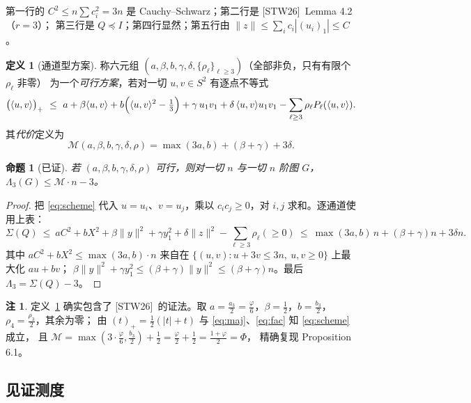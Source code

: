 \documentclass[UTF8,11pt]{ctexart}
\newtheorem{proposition}[theorem]{命题}
\theoremstyle{definition}
\newtheorem{definition}[theorem]{定义}
\newtheorem{remark}[theorem]{注}
\newcommand{\Lam}{\Lambda}
\newcommand{\STW}{\textup{[STW26]}}
\begin{document}
第一行的 $C^2\le n\sum c_i^2=3n$ 是 Cauchy--Schwarz；第二行是 \STW\ Lemma 4.2（$r=3$）；
第三行是 $Q\preceq I$；第四行显然；第五行由 $\|z\|\le\sum_ic_i|(u_i)_1|\le C$。

\begin{definition}[通道型方案]\label{def:scheme}
称六元组 $(a,\beta,b,\gamma,\delta,\{\rho_\ell\}_{\ell\ge3})$（全部非负，只有有限个 $\rho_\ell$ 非零）
为一个\emph{可行方案}，若对一切 $u,v\in S^2$ 有逐点不等式
\begin{equation}\label{eq:scheme}
\bigl(\langle u,v\rangle\bigr)_+\ \le\
a+\beta\langle u,v\rangle+b\Bigl(\langle u,v\rangle^2-\tfrac13\Bigr)
+\gamma\,u_1v_1+\delta\,\langle u,v\rangle u_1v_1-\sum_{\ell\ge3}\rho_\ell P_\ell(\langle u,v\rangle).
\end{equation}
其\emph{代价}定义为
\[
\mathcal M(a,\beta,b,\gamma,\delta,\rho)=\max(3a,b)+(\beta+\gamma)+3\delta .
\]
\end{definition}

\begin{proposition}[已证]\label{prop:schemevalid}
若 $(a,\beta,b,\gamma,\delta,\rho)$ 可行，则对一切 $n$ 与一切 $n$ 阶图 $G$，
$\Lam_3(G)\le\mathcal M\cdot n-3$。
\end{proposition}

\begin{proof}
把 \eqref{eq:scheme} 代入 $u=u_i$、$v=u_j$，乘以 $c_ic_j\ge0$，对 $i,j$ 求和。逐通道使用上表：
\[
\Sigma(Q)\ \le\ aC^2+bX^2+\beta\|y\|^2+\gamma y_1^2+\delta\|z\|^2-\sum_{\ell\ge3}\rho_\ell(\ge0)
\ \le\ \max(3a,b)\,n+(\beta+\gamma)n+3\delta n .
\]
其中 $aC^2+bX^2\le\max(3a,b)\cdot n$ 来自在 $\{(u,v):u+3v\le3n,\ u,v\ge0\}$ 上最大化 $au+bv$；
$\beta\|y\|^2+\gamma y_1^2\le(\beta+\gamma)\|y\|^2\le(\beta+\gamma)n$。最后 $\Lam_3=\Sigma(Q)-3$。
\end{proof}

\begin{remark}
定义~\ref{def:scheme} 确实包含了 \STW\ 的证法。取
$a=\frac{a_3}2=\frac{\varphi}6$，$\beta=\frac12$，$b=\frac{b_3}2$，$\rho_4=\frac{\rho_3}2$，其余为零；
由 $(t)_+=\frac12(|t|+t)$ 与 \eqref{eq:maj}、\eqref{eq:fac} 知 \eqref{eq:scheme} 成立，
且 $\mathcal M=\max(3\cdot\frac\varphi6,\frac{b_3}2)+\frac12=\frac\varphi2+\frac12=\frac{1+\varphi}2=\Phi$，
精确复现 Proposition 6.1。
\end{remark}

\subsection{见证测度}
\end{document}
